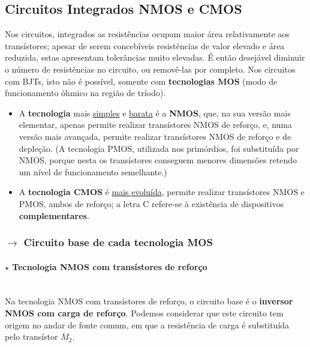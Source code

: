 \subsection[5.1 Circuitos Integrados NMOS e CMOS]{\hspace*{0.075 em}\raisebox{0.2 em}{$\pmb{\drsh}$} Circuitos Integrados NMOS e CMOS}
\label{subsec:circuitos-integrados-NMOS-e-CMOS}

Nos circuitos, integrados as resistências ocupam maior área relativamente aos transístores; apesar de serem concebíveis resistências de valor elevado e área reduzida, estas apresentam tolerâncias muito elevadas. É então desejável diminuir o número de resistências no circuito, ou removê-las por completo. Nos circuitos com BJTs, isto não é possível, somente com \textbf{tecnologias MOS} (modo de funcionamento óhmico na região de tríodo). 

\begin{itemize}[leftmargin=*]
    \item A \textbf{tecnologia} mais \underline{simples} e \underline{barata} é a \textbf{NMOS}, que, na sua versão mais elementar, apenas permite realizar transístores NMOS de reforço, e, numa versão mais avançada, permite realizar transístores NMOS de reforço e de depleção. (A tecnologia PMOS, utilizada nos primórdios, foi substituída por NMOS, porque nesta os transístores conseguem menores dimensões retendo um nível de funcionamento semelhante.)
    
    \item A \textbf{tecnologia CMOS} é \underline{mais evoluída}, permite realizar transístores NMOS e PMOS, ambos de reforço; a letra C refere-se à existência de dispositivos \textbf{complementares}.
\end{itemize}

\subsubsection[5.1.1 Circuito base de cada tecnologia MOS]{$\pmb{\rightarrow}$ Circuito base de cada tecnologia MOS}

\paragraph[5.1.1.1 Tecnologia NMOS com transístores de reforço]{$\pmb{\star}$ Tecnologia NMOS com transístores de reforço}\mbox{}\\[4pt]
Na tecnologia NMOS com transístores de reforço, o circuito base é o \textbf{inversor NMOS com carga de reforço}. Podemos considerar que este circuito tem origem no andar de fonte comum, em que a resistência de carga é substituída pelo transístor $M_2$.

